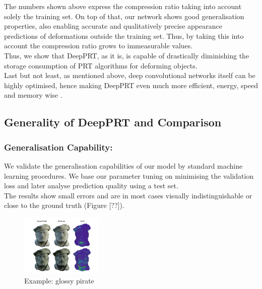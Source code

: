 The numbers shown above express the compression ratio taking into account solely the training set. On top of that, our network shows good generalisation properties, also enabling accurate and qualitatively precise appearance predictions of deformations outside the training set. Thus, by taking this into account the compression ratio grows to immeasurable values. 
\\
Thus, we show that DeepPRT, as it is, is capable of drastically diminishing the storage consumption of PRT algorithms for deforming objects. 
\\
Last but not least, as mentioned above, deep convolutional networks itself can be highly optimised, hence making DeepPRT even much more efficient, energy, speed and memory wise \cite{Survey_NN_Compression}. 
\subsection*{Generality of DeepPRT and Comparison}
\subsubsection*{Generalisation Capability:}
We validate the generalisation capabilities of our model by standard machine learning procedures. We base our parameter tuning on minimising the validation loss and later analyse prediction quality using a test set.\\ 
The results show small errors and are in most cases visually indistinguishable or close to the ground truth (Figure [??]). 
\begin{figure}[H]
  \centering
    \includegraphics[width=0.35\textwidth]{Figures/glossy_pirate.pdf}
     \caption{Example: glossy pirate}
     \label{Fig: glossy_pirate}
\end{figure}
